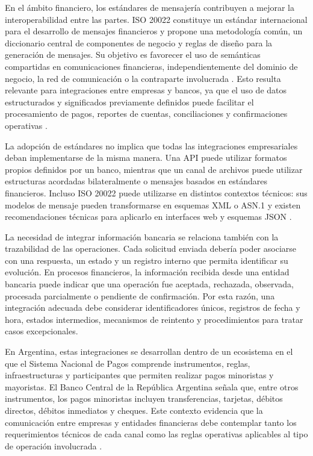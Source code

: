 En el ámbito financiero, los estándares de mensajería contribuyen a mejorar la interoperabilidad entre las partes. ISO 20022 constituye un estándar internacional para el desarrollo de mensajes financieros y propone una metodología común, un diccionario central de componentes de negocio y reglas de diseño para la generación de mensajes. Su objetivo es favorecer el uso de semánticas compartidas en comunicaciones financieras, independientemente del dominio de negocio, la red de comunicación o la contraparte involucrada \citep{iso20022}. Esto resulta relevante para integraciones entre empresas y bancos, ya que el uso de datos estructurados y significados previamente definidos puede facilitar el procesamiento de pagos, reportes de cuentas, conciliaciones y confirmaciones operativas \citep{iso20022}.

La adopción de estándares no implica que todas las integraciones empresariales deban implementarse de la misma manera. Una API puede utilizar formatos propios definidos por un banco, mientras que un canal de archivos puede utilizar estructuras acordadas bilateralmente o mensajes basados en estándares financieros. Incluso ISO 20022 puede utilizarse en distintos contextos técnicos: sus modelos de mensaje pueden transformarse en esquemas XML o ASN.1 y existen recomendaciones técnicas para aplicarlo en interfaces web y esquemas JSON \citep{iso20022rmg2025}.

La necesidad de integrar información bancaria se relaciona también con la trazabilidad de las operaciones. Cada solicitud enviada debería poder asociarse con una respuesta, un estado y un registro interno que permita identificar su evolución. En procesos financieros, la información recibida desde una entidad bancaria puede indicar que una operación fue aceptada, rechazada, observada, procesada parcialmente o pendiente de confirmación. Por esta razón, una integración adecuada debe considerar identificadores únicos, registros de fecha y hora, estados intermedios, mecanismos de reintento y procedimientos para tratar casos excepcionales.

En Argentina, estas integraciones se desarrollan dentro de un ecosistema en el que el Sistema Nacional de Pagos comprende instrumentos, reglas, infraestructuras y participantes que permiten realizar pagos minoristas y mayoristas. El Banco Central de la República Argentina señala que, entre otros instrumentos, los pagos minoristas incluyen transferencias, tarjetas, débitos directos, débitos inmediatos y cheques. Este contexto evidencia que la comunicación entre empresas y entidades financieras debe contemplar tanto los requerimientos técnicos de cada canal como las reglas operativas aplicables al tipo de operación involucrada \citep{bcra_snp}.


